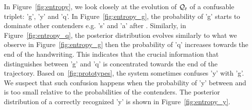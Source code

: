 \documentclass{sigchi}
\begin{document}
In Figure~\ref{fig:entropy}, we look closely at the evolution of
$\mathcal{Q}_{t}$ of a confusable triplet: 'g', 'y' and 'q'. In
Figure~\ref{fig:entropy_g}, the probability of 'g' starts to dominate
other contenders e.g. 's' and 'a' after . Similarly, in
Figure~\ref{fig:entropy_q}, the posterior distribution evolves
similarly to what we observe in Figure~\ref{fig:entropy_g} then the
probability of 'q' increases towards the end of the handwriting. This
indicates that the crucial information that distinguishes between 'g'
and 'q' is concentrated towards the end of the trajectory. Based
on~\ref{fig:prototypes}, the system sometimes confuses 'y' with 'g'. We
suspect that such confusion happens when the probability of 'y' between
 and  is too small relative to the probabilities of the
contenders. The posterior distribution of a correctly recognized 'y'
is shown in Figure~\ref{fig:entropy_y}.
\end{document}
